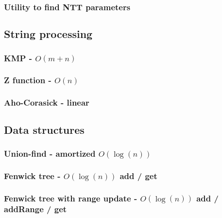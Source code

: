 \documentclass[landscape,a4paper,twocolumn,10pt]{report}
\begin{document}
\subsubsection{Utility to find NTT parameters}




\subsection*{String processing}
\label{string}

\subsubsection{KMP - $O(m+n)$}


\subsubsection{Z function - $O(n)$}


\subsubsection{Aho-Corasick - linear}




\subsection*{Data structures}
\label{datastruct}

\subsubsection{Union-find - amortized $O(\log(n))$}


\subsubsection{Fenwick tree - $O(\log(n))$ add / get}


\subsubsection{Fenwick tree with range update - $O(\log(n))$ add / addRange / get}

\end{document}
